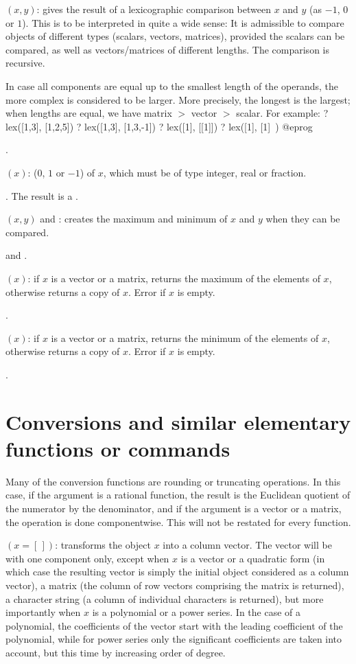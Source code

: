 $(x,y)$: gives the result of a lexicographic comparison
between $x$ and $y$ (as $-1$, $0$ or $1$). This is to be interpreted in quite
a wide sense: It is admissible to compare objects of different types
(scalars, vectors, matrices), provided the scalars can be compared, as well
as vectors/matrices of different lengths. The comparison is recursive.

In case all components are equal up to the smallest length of the operands,
the more complex is considered to be larger. More precisely, the longest is
the largest; when lengths are equal, we have matrix $>$ vector $>$ scalar.
For example:
\bprog
? lex([1,3], [1,2,5])
? lex([1,3], [1,3,-1])
? lex([1], [[1]])
? lex([1], [1]~)
@eprog

.

$(x)$:  ($0$, $1$ or $-1$) of $x$, which must be of
type integer, real or fraction.

. The result is a .

$(x,y)$ and : creates the
maximum and minimum of $x$ and $y$ when they can be compared.

 and .

$(x)$: if $x$ is a vector or a matrix, returns the maximum
of the elements of $x$, otherwise returns a copy of $x$. Error if $x$ is
empty.

.

$(x)$: if $x$ is a vector or a matrix, returns the minimum
of the elements of $x$, otherwise returns a copy of $x$. Error if $x$ is
empty.

.

\section{Conversions and similar elementary functions or commands}
\label{se:conversion}

\noindent
Many of the conversion functions are rounding or truncating operations. In
this case, if the argument is a rational function, the result is the
Euclidean quotient of the numerator by the denominator, and if the argument
is a vector or a matrix, the operation is done componentwise. This will not
be restated for every function.

$({x=[\,]})$: transforms the object $x$ into a column vector.
The vector will be with one component only, except when $x$ is a
vector or a quadratic form (in which case the resulting vector is simply the
initial object considered as a column vector), a matrix (the column of row
vectors comprising the matrix is returned), a character string (a column of
individual characters is returned), but more importantly when $x$ is a
polynomial or a power series. In the case of a polynomial, the coefficients
of the vector start with the leading coefficient of the polynomial, while for
power series only the significant coefficients are taken into account, but
this time by increasing order of degree.

